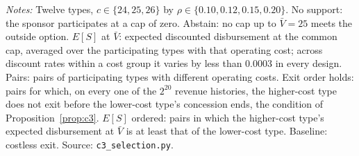 \begin{table}[htbp]\centering\small
\caption{Sponsor pool by design: participation categories and expected disbursement at the common cap by operating cost}\label{tab:c3pool}
\par\smallskip\begin{minipage}{\textwidth}\footnotesize\textit{Notes:} Twelve types, $c \in \{24, 25, 26\}$ by $\rho \in \{0.10, 0.12, 0.15, 0.20\}$. No support: the sponsor participates at a cap of zero. Abstain: no cap up to $\bar V = 25$ meets the outside option. $E[S]$ at $\bar V$: expected discounted disbursement at the common cap, averaged over the participating types with that operating cost; across discount rates within a cost group it varies by less than 0.0003 in every design. Pairs: pairs of participating types with different operating costs. Exit order holds: pairs for which, on every one of the $2^{20}$ revenue histories, the higher-cost type does not exit before the lower-cost type's concession ends, the condition of Proposition~\ref{prop:c3}. $E[S]$ ordered: pairs in which the higher-cost type's expected disbursement at $\bar V$ is at least that of the lower-cost type. Baseline: costless exit. Source: \texttt{c3\_selection.py}.\end{minipage}
\end{table}

